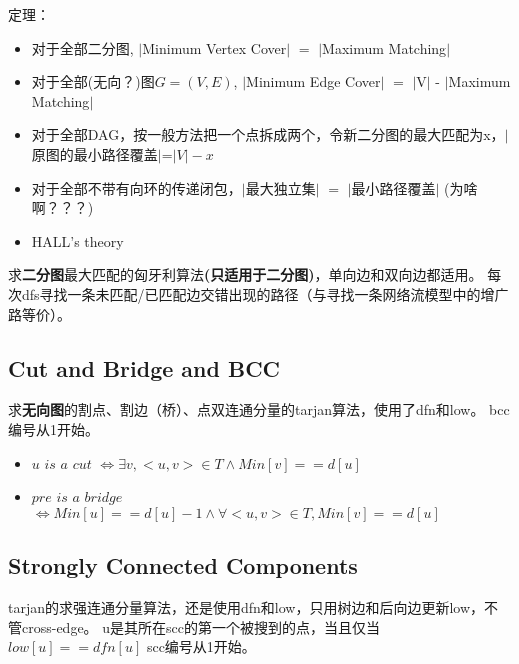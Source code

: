 \documentclass[twoside, UTF8]{article}
\begin{document}
			\begin{flushleft}
				定理：
				\begin{itemize}
					\item 对于全部二分图, $|$Minimum Vertex Cover$|$ $=$ $|$Maximum Matching$|$
					\item 对于全部{\tiny (无向？)}图$G=(V,E)$, $|$Minimum Edge Cover$|$ $=$ $|$V$|$ - $|$Maximum Matching$|$
					\item 对于全部DAG，按一般方法把一个点拆成两个，令新二分图的最大匹配为x，$|$原图的最小路径覆盖$|$=$|V| - x$
					\item 对于全部不带有向环的传递闭包，$|$最大独立集$|$ $=$ $|$最小路径覆盖$|$ (为啥啊？？？)
					\item HALL's theory
				\end{itemize}
			\end{flushleft}
			
			\begin{flushleft}
				求\textbf{二分图}最大匹配的匈牙利算法\textbf{(只适用于二分图)}，单向边和双向边都适用。
				\linebreak 每次dfs寻找一条未匹配/已匹配边交错出现的路径（与寻找一条网络流模型中的增广路等价）。
			\end{flushleft}
			
		\newpage
		\subsection{Cut and Bridge and BCC}
			\begin{flushleft}
				求\textbf{无向图}的割点、割边（桥）、点双连通分量的tarjan算法，使用了dfn和low。
				\linebreak bcc编号从1开始。
			\end{flushleft}
			
			\begin{itemize}
				\item $u$ $is$ $a$ $cut$ $\Leftrightarrow \exists v, <u, v> \in T \wedge Min[v] == d[u]$
				\item $pre$ $is$ $a$ $bridge$ $\Leftrightarrow Min[u] == d[u] - 1 \wedge \forall <u, v> \in T, Min[v] == d[u]$
			\end{itemize}
		\newpage
		\subsection{Strongly Connected Components}
			\begin{flushleft}
				tarjan的求强连通分量算法，还是使用dfn和low，只用树边和后向边更新low，不管cross-edge。
				\linebreak u是其所在scc的第一个被搜到的点，当且仅当$low[u] == dfn[u]$
				\linebreak scc编号从1开始。
			\end{flushleft}
			
	\newpage
\end{document}
